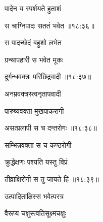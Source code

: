 {\devanagarifontbold पादेन य स्पर्शयते हुताशं }%
  \dontdisplaylinenum

\nemslokad

{\devanagarifontbold स चाग्निपादः सततं भवेत {॥१८:३६॥} \veg\dontdisplaylinenum }%
 
\ujvers{}

\nemslokab

{\devanagarifontbold स पादच्छेदं बहुशो लभेत  \danda\dontdisplaylinenum }%
 
\nemslokac

{\devanagarifontbold ग्रन्थापहारी स भवेत मूकः }%
  \dontdisplaylinenum

\nemslokad

{\devanagarifontbold दुर्गन्धवक्त्रः परिछिद्रवादी {॥१८:३७॥} \veg\dontdisplaylinenum }%
 
\ujvers{}

\nemslokab

{\devanagarifontbold अनम्रवक्त्रस्त्वनृतापवादी  \danda\dontdisplaylinenum }%
 
\nemslokac

{\devanagarifontbold पारुष्यवक्ता मुखपाकरागी }%
  \dontdisplaylinenum

\nemslokad

{\devanagarifontbold असत्प्रलापी स च दन्तरोगः {॥१८:३८॥} \veg\dontdisplaylinenum }%
 
\ujvers{}

\nemslokab

{\devanagarifontbold सम्भिन्नवक्ता स च कण्ठरोगी  \danda\dontdisplaylinenum }%
 
\nemslokac

{\devanagarifontbold क्रुद्धेक्षणः पश्यति यस्तु विप्रं }%
  \dontdisplaylinenum

\nemslokad

{\devanagarifontbold तीव्राक्षिरोगी स तु जायते हि {॥१८:३९॥} \veg\dontdisplaylinenum }%
 
\ujvers{}

\nemslokab

{\devanagarifontbold उत्पादिताक्षिस्स भवेत्परत्र  \danda\dontdisplaylinenum }%
 
\nemslokac

{\devanagarifontbold वैरूप्य चक्षुस्त्वतिसूक्ष्मचक्षुः }%
  \dontdisplaylinenum

